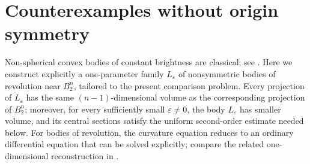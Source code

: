 \documentclass[11pt]{article}
\theoremstyle{remark}
\begin{document}
\section{Counterexamples without origin symmetry}\label{sec:nonsymmetric}

Non-spherical convex bodies of constant brightness are classical; see
\cite{FireyConstantBrightness}.  Here we construct explicitly a
one-parameter family $L_\varepsilon$ of nonsymmetric bodies of revolution
near $B_2^n$, tailored to the present comparison problem.  Every projection
of $L_\varepsilon$ has the same $(n-1)$-dimensional volume as the
corresponding projection of $B_2^n$; moreover, for every sufficiently small
$\varepsilon\ne0$, the body $L_\varepsilon$ has smaller volume, and its
central sections satisfy the uniform second-order estimate needed below.
For bodies of revolution, the curvature equation reduces to an ordinary
differential equation that can be solved explicitly; compare the related
one-dimensional reconstruction in
\cite{RyaboginZvavitchReconstruction}.
\end{document}
